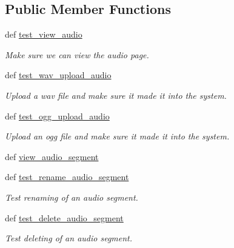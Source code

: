 \subsection*{Public Member Functions}
\begin{DoxyCompactItemize}
\item 
def \hyperlink{classconcertapp_1_1tests_1_1_audio_test_aa06f765534d1c5e6dd0b066b07dce99b}{test\_\-view\_\-audio}
\begin{DoxyCompactList}\small\item\em Make sure we can view the audio page. \item\end{DoxyCompactList}\item 
def \hyperlink{classconcertapp_1_1tests_1_1_audio_test_a338dfde4127f1acbc08d6624c89d05f5}{test\_\-wav\_\-upload\_\-audio}
\begin{DoxyCompactList}\small\item\em Upload a wav file and make sure it made it into the system. \item\end{DoxyCompactList}\item 
def \hyperlink{classconcertapp_1_1tests_1_1_audio_test_a3432560799e28a8e06d3f37d61aa528d}{test\_\-ogg\_\-upload\_\-audio}
\begin{DoxyCompactList}\small\item\em Upload an ogg file and make sure it made it into the system. \item\end{DoxyCompactList}\item 
def \hyperlink{classconcertapp_1_1tests_1_1_audio_test_a8190e72d24ae860a34b3edf0db9034ac}{view\_\-audio\_\-segment}
\item 
def \hyperlink{classconcertapp_1_1tests_1_1_audio_test_abc6f632a4e7221e1a40dff5782886e8c}{test\_\-rename\_\-audio\_\-segment}
\begin{DoxyCompactList}\small\item\em Test renaming of an audio segment. \item\end{DoxyCompactList}\item 
def \hyperlink{classconcertapp_1_1tests_1_1_audio_test_a680c69c6e2505729907b277f061bd36b}{test\_\-delete\_\-audio\_\-segment}
\begin{DoxyCompactList}\small\item\em Test deleting of an audio segment. \item\end{DoxyCompactList}\item 

\end{DoxyCompactItemize}

